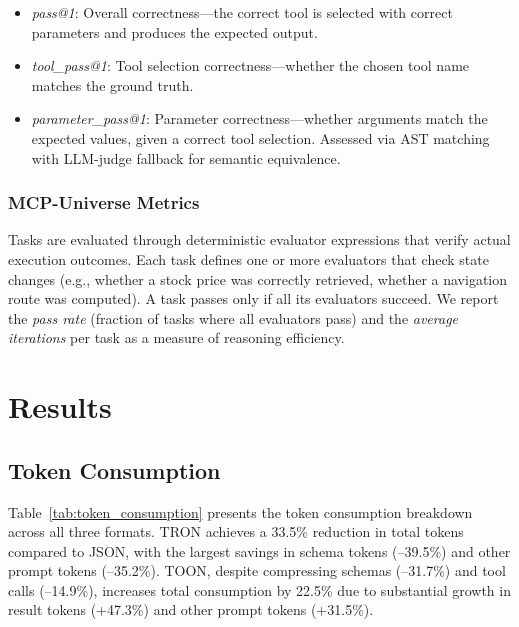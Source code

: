 \documentclass[10pt,twocolumn,letterpaper]{article}
\begin{document}
\begin{itemize}
    \item \textit{pass@1}: Overall correctness---the correct tool is selected with correct parameters and produces the expected output.
    \item \textit{tool\_pass@1}: Tool selection correctness---whether the chosen tool name matches the ground truth.
    \item \textit{parameter\_pass@1}: Parameter correctness---whether arguments match the expected values, given a correct tool selection. Assessed via AST matching with LLM-judge fallback for semantic equivalence.
\end{itemize}

\subsubsection{MCP-Universe Metrics}
Tasks are evaluated through deterministic evaluator expressions that verify actual execution outcomes. Each task defines one or more evaluators that check state changes (e.g., whether a stock price was correctly retrieved, whether a navigation route was computed). A task passes only if all its evaluators succeed. We report the \textit{pass rate} (fraction of tasks where all evaluators pass) and the \textit{average iterations} per task as a measure of reasoning efficiency.

\section{Results}
\label{sec:results}

\subsection{Token Consumption}

Table~\ref{tab:token_consumption} presents the token consumption breakdown across all three formats. TRON achieves a 33.5\% reduction in total tokens compared to JSON, with the largest savings in schema tokens (--39.5\%) and other prompt tokens (--35.2\%). TOON, despite compressing schemas (--31.7\%) and tool calls (--14.9\%), increases total consumption by 22.5\% due to substantial growth in result tokens (+47.3\%) and other prompt tokens (+31.5\%).
\end{document}
